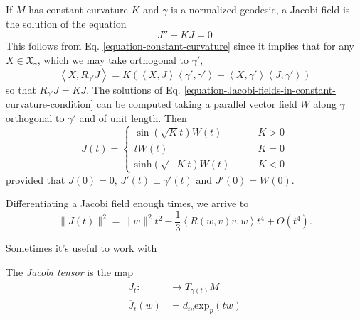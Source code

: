 \begin{example}
\label{example-jacobi-fields-in-constant-curvature-condition}
If $M$ has constant curvature $K$ and $\gamma$ is a normalized geodesic, a 
Jacobi field is the solution of the equation
\begin{equation}
\label{equation-Jacobi-fields-in-constant-curvature-condition}
J''+KJ=0
\end{equation}
This follows from Eq. \ref{equation-constant-curvature} since it implies that
for any $X\in\mathfrak{X}_\gamma$, which we may take orthogonal to $\gamma'$,
$$
\left<X,R_{\gamma'}J\right>
=K(\left<X,J\right>\left<\gamma',\gamma'\right>
-\left<X,\gamma'\right>\left<J,\gamma'\right>)
$$
so that $R_{\gamma'}J=KJ$. The solutions of Eq.
\ref{equation-Jacobi-fields-in-constant-curvature-condition} can be computed taking a
parallel vector field $W$ along $\gamma$ orthogonal to $\gamma'$ and of unit
length. Then
\begin{equation}
\label{equation-Jacobi-fields-in-constant-curvature}
J(t)=\begin{cases}
\sin(\sqrt{K}t)W(t)\qquad & K>0\\
tW(t)\qquad &K=0\\
\text{sinh}(\sqrt{-K}t)W(t)\qquad &K<0
\end{cases}
\end{equation}
provided that $J(0)=0$, $J'(t)\perp \gamma'(t)$ and $J'(0)=W(0)$.
\end{example}

\begin{proposition}
\label{proposition-Jacobi-field-Taylor-expansion}
Differentiating a Jacobi field enough times, we arrive to
\begin{equation}
\label{equation-Jacobi-field-Taylor-expansion}
\|J(t)\|^2=\|w\|^2t^2-\frac{1}{3}\left<R(w,v)v,w\right>t^4+O(t^4).
\end{equation}
\end{proposition}

Sometimes it's useful to work with

\begin{definition}
\label{definition-Jacobi-tensor}
The {\it Jacobi tensor} is the map
\begin{align*}
	\overline{J}_t:  &\longrightarrow T_{\gamma(t)}M \\
	 \overline{J}_t(w)&=d_{tv}\text{exp}_p(tw)
\end{align*}
\end{definition}

